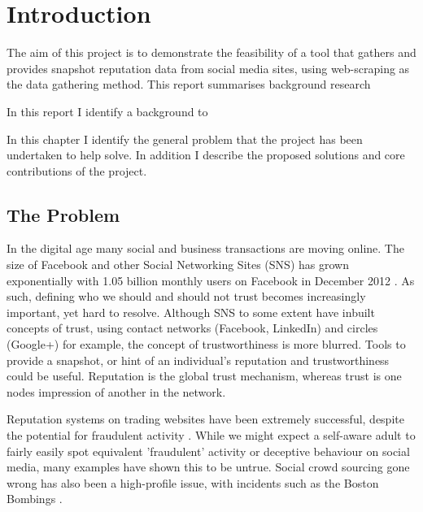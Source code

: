 \chapter{Introduction}\label{C:us}

The aim of this project is to demonstrate the feasibility of a tool that gathers and provides snapshot reputation data from social media sites, using web-scraping as the data gathering method. This report summarises background research 

In this report I identify a background to 

In this chapter I identify the general problem that the project has been undertaken to help solve. In addition I describe the proposed solutions and core contributions of the project.





\section{The Problem}
In the digital age many social and business transactions are moving online. The size of Facebook and other Social Networking Sites (SNS) has grown exponentially with 1.05 billion monthly users on Facebook in December 2012 \cite{fb_users}. As such, defining who we should and should not trust becomes increasingly important, yet hard to resolve. Although SNS to some extent have inbuilt concepts of trust, using contact networks (Facebook, LinkedIn) and circles (Google+) for example, the concept of trustworthiness is more blurred. Tools to provide a snapshot, or hint of an individual's reputation and trustworthiness could be useful. Reputation is the global trust mechanism, whereas trust is one nodes impression of another in the network.

Reputation systems on trading websites have been extremely successful, despite the potential for fraudulent activity \cite{}. While we might expect a self-aware adult to fairly easily spot equivalent 'fraudulent' activity or deceptive behaviour on social media, many examples have shown this to be untrue. Social crowd sourcing gone wrong has also been a high-profile issue, with incidents such as the Boston Bombings \cite{}.

